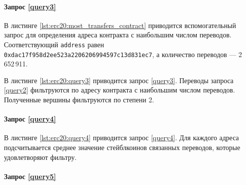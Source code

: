 \paragraph{Запрос \ref{query3}}

В листинге \ref{lst:erc20:most_transfers_contract} приводится вспомогательный запрос для определения адреса контракта
с наибольшим числом переводов. Соответствующий \texttt{address} равен \texttt{0xdac17f958d2ee523a2206206994597c13d831ec7}, а
количество переводов --- 2\,652\,911.


В листинге \ref{lst:erc20:query3} приводится запрос \ref{query3}. Переводы запроса \ref{query2} фильтруются по
адресу контракта с наибольшим числом переводов. Полученные вершины фильтруются по степени 2.


\paragraph{Запрос \ref{query4}}

В листинге \ref{lst:erc20:query4} приводится запрос \ref{query4}. Для каждого адреса подсчитывается среднее значение
стейблкоинов связанных переводов, которые удовлетворяют фильтру.


\paragraph{Запрос \ref{query5}}

